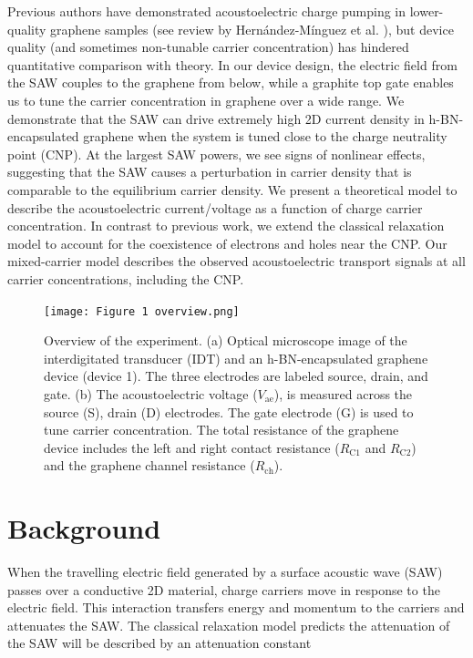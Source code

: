 \documentclass[double,12pt,1in,seploa]{beavtex}
\let\Oldsection\section
\renewcommand{\section}{\FloatBarrier\Oldsection}
\begin{document}
Previous authors have demonstrated acoustoelectric charge pumping in lower-quality graphene samples (see review by Hernández-Mínguez et al. \cite{hernandez-minguez_interaction_2018}), but device quality (and sometimes non-tunable carrier concentration) has hindered quantitative comparison with theory. In our device design, the electric field from the SAW couples to the graphene from below, while a graphite top gate enables us to tune the carrier concentration in graphene over a wide range. We demonstrate that the SAW can drive extremely high 2D current density in h-BN-encapsulated graphene when the system is tuned close to the charge neutrality point (CNP). At the largest SAW powers, we see signs of nonlinear effects, suggesting that the SAW causes a perturbation in carrier density that is comparable to the equilibrium carrier density.  We present a theoretical model to describe the acoustoelectric current/voltage as a function of charge carrier concentration. In contrast to previous work, we extend the classical relaxation model to account for the coexistence of electrons and holes near the CNP. Our mixed-carrier model describes the observed acoustoelectric transport signals at all carrier concentrations, including the CNP.

\begin{figure}
    \texttt{[image: Figure 1 overview.png]}
    \caption{Overview of the experiment. (a) Optical microscope image of the interdigitated transducer (IDT) and an h-BN-encapsulated graphene device (device 1). The three electrodes are labeled source, drain, and gate. (b) The acoustoelectric voltage ($V_{\mathrm{ae}}$), is measured across the source (S), drain (D) electrodes. The gate electrode (G) is used to tune carrier concentration. The total resistance of the graphene device includes the left and right contact resistance ($R_{\mathrm{C1}}$  and $R_{\mathrm{C2}}$) and the graphene channel resistance ($R_{\mathrm{ch}}$).}
    \label{AECP Figure 1}
\end{figure}
\section{Background}

When the travelling electric field generated by a surface acoustic wave (SAW) passes over a conductive 2D material, charge carriers move in response to the electric field. This interaction transfers energy and momentum to the carriers and attenuates the SAW. The classical relaxation model predicts the attenuation of the SAW will be described by an attenuation constant \cite{wixforth_surface_1989}
\end{document}
